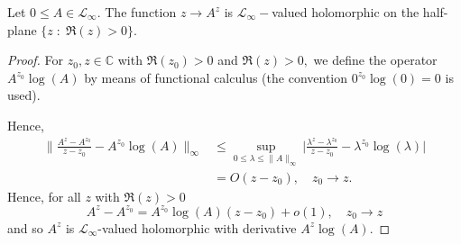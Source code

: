     \begin{lem}\label{exp fact} 
        Let $0\leq A\in\mathcal{L}_{\infty}.$ The function $z\to A^z$ is $\mathcal{L}_{\infty}-$valued holomorphic on the half-plane $\{z\;:\;\Re(z)>0\}.$
    \end{lem}
    \begin{proof} 
        For $z_0,z\in\mathbb{C}$ with $\Re(z_0)>0$ and $\Re(z)> 0,$ we define the operator $A^{z_0}\log(A)$ by means of functional calculus (the convention $0^{z_0}\log(0)=0$ is used). 
        
        Hence,
        \begin{align*}
            \Big\|\frac{A^z-A^{z_0}}{z-z_0}-A^{z_0}\log(A)\Big\|_{\infty} &\leq \sup_{0\leq \lambda\leq\|A\|_{\infty}}\Big|\frac{\lambda^z-\lambda^{z_0}}{z-z_0}-\lambda^{z_0}\log(\lambda)\Big|\\
                                                                          &= O(z-z_0),\quad z_0\to z.
        \end{align*}
        Hence, for all $z$ with $\Re(z) > 0$
        \begin{equation*}
            A^z-A^{z_0} = A^{z_0}\log(A)(z-z_0)+o(1),\quad z_0\to z
        \end{equation*}
        and so $A^z$ is $\mathcal{L}_\infty$-valued holomorphic with derivative $A^{z}\log(A)$.
    \end{proof}

